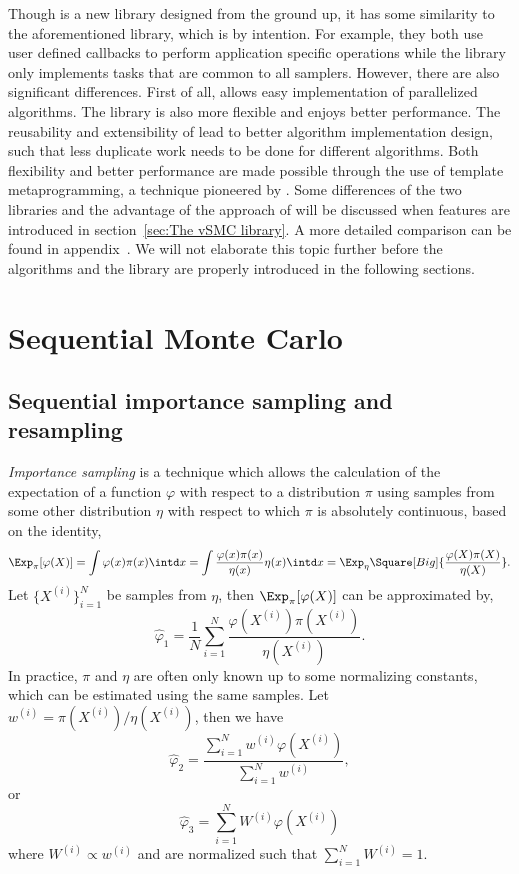 \documentclass[11pt, fontset=Minion, showoverfull,
bib, mintcode, minted=cache]{marticle}
\begin{document}
Though \vsmc is a new library designed from the ground up, it has some
similarity to the aforementioned \lsmctc library, which is by intention. For
example, they both use user defined callbacks to perform application specific
operations while the library only implements tasks that are common to all
samplers. However, there are also significant differences. First of all, \vsmc
allows easy implementation of parallelized algorithms. The library is also
more flexible and enjoys better performance. The reusability and extensibility
of \vsmc lead to better algorithm implementation design, such that less
duplicate work needs to be done for different algorithms. Both flexibility and
better performance are made possible through the use of template
metaprogramming, a technique pioneered by \fblitz. Some differences of the two
libraries and the advantage of the approach of \vsmc will be discussed when
features are introduced in section~\ref{sec:The vSMC library}. A more detailed
comparison can be found in appendix~. We will not
elaborate this topic further before the \smc algorithms and the library are
properly introduced in the following sections.

\section{Sequential Monte Carlo}
\label{sec:Sequential Monte Carlo}

\subsection{Sequential importance sampling and resampling}
\label{sub:Sequential importance sampling and resampling}

\emph{Importance sampling} is a technique which allows the calculation of the
expectation of a function $\varphi$ with respect to a distribution $\pi$ using
samples from some other distribution $\eta$ with respect to which $\pi$ is
absolutely continuous, based on the identity,
\begin{equation}
  \Exp_{\pi}[\varphi(X)]
  = \int\varphi(x)\pi(x)\intd x
  = \int\frac{\varphi(x)\pi(x)}{\eta(x)}\eta(x)\intd x
  = \Exp_{\eta}\Square[Big]{\frac{\varphi(X)\pi(X)}{\eta(X)}}.
\end{equation}
Let $\{X^{(i)}\}_{i=1}^N$ be samples from $\eta$, then
$\Exp_{\pi}[\varphi(X)]$ can be approximated by,
\begin{equation}
  \hat\varphi_1 =
  \frac{1}{N}\sum_{i=1}^N\frac{\varphi(X^{(i)})\pi(X^{(i)})}{\eta(X^{(i)})}.
\end{equation}
In practice, $\pi$ and $\eta$ are often only known up to some normalizing
constants, which can be estimated using the same samples. Let $w^{(i)} =
\pi(X^{(i)})/\eta(X^{(i)})$, then we have
\begin{equation}
  \hat\varphi_2 =
  \frac{\sum_{i=1}^Nw^{(i)}\varphi(X^{(i)})}{\sum_{i=1}^Nw^{(i)}},
\end{equation}
or
\begin{equation}
  \hat\varphi_3 = \sum_{i=1}^NW^{(i)}\varphi(X^{(i)})
\end{equation}
where $W^{(i)}\propto w^{(i)}$ and are normalized such that $\sum_{i=1}^N
W^{(i)} = 1$.
\end{document}
